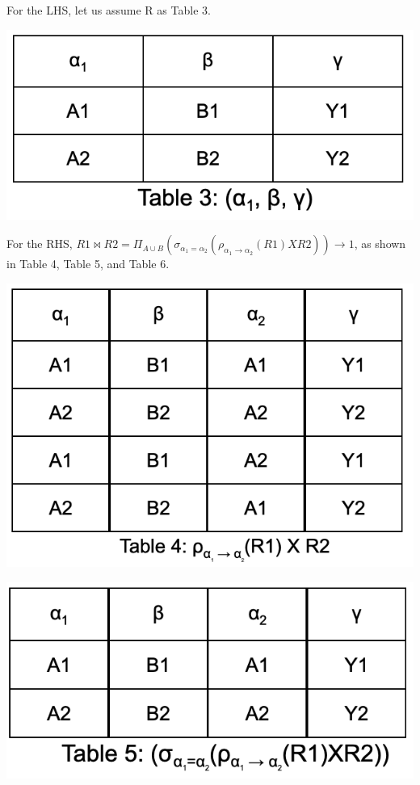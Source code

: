 \documentclass[a4paper, 11pt]{article}
\begin{document}
For the LHS, let us assume R as Table 3. \\
\begin{center}
\includegraphics[scale = 0.5]{pic2.png}\\
\end{center}

For the RHS, $R1 \bowtie R2 = \Pi_{A\cup B}(\sigma_{\alpha_1=\alpha_2}(\rho_{\alpha_1\xrightarrow{}\alpha_2}(R1)XR2))\longrightarrow{1}$, as shown in Table 4, Table 5, and Table 6.
\begin{center}
\includegraphics[scale = 0.7]{pic3.png}\\
\end{center}
\begin{center}
\includegraphics[scale = 0.7]{pic4.png}\\
\end{center}
\end{document}
